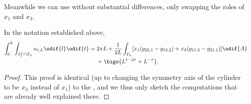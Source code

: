 \documentclass[titlepage,numbers=noenddot,oneside,%
cleardoublepage=empty,paper=a4,fontsize=11pt,%
english,%
]{scrartcl}
\begin{document}
Meanwhile we can use \cite[Lemma 6.2]{brayHarmonicFunctionsMass2019} without substantial differences, only swapping the roles of \( x_1 \) and \( x_3 \).
\begin{lemma}\label{lem:geodesic_curvature_term}
    In the notation established above,
    \begin{equation*}
        \int_0^L \int_{S_t^L\cap T_L}\kappa_{t,L}\odif{l}\odif{t}=\begin{aligned}[t]
            &2\pi L+\frac{1}{2L}\int_{T_L}[x_1(g_{22,1}-g_{12,2})+x_3(g_{11,2}-g_{21,1})]\odif{A}\\
            &+\bigo{L^{1-2\tau}+L^{-\tau}}.
        \end{aligned}
    \end{equation*}
\end{lemma}
\begin{proof}
    This proof is identical (up to changing the symmetry axis of the cylinder to be \( x_3 \) instead of \( x_1 \)) to the \cite[proof of Lemma 6.2 in][]{brayHarmonicFunctionsMass2019}, and we thus only sketch the computations that are already well explained there.


\end{proof}
\end{document}
